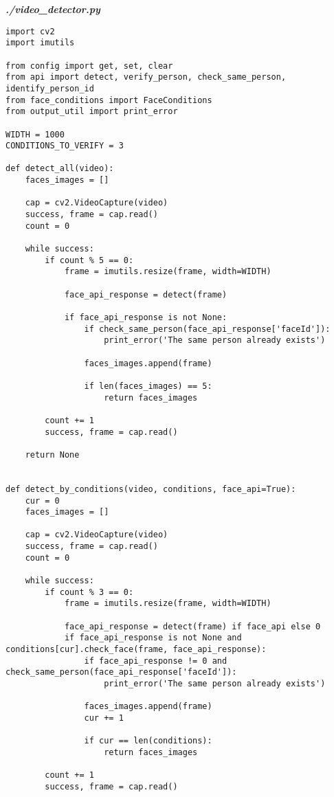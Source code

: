 \textit{\textbf{./video\_detector.py}}
\begin{verbatim}
import cv2
import imutils

from config import get, set, clear
from api import detect, verify_person, check_same_person, identify_person_id
from face_conditions import FaceConditions
from output_util import print_error

WIDTH = 1000
CONDITIONS_TO_VERIFY = 3

def detect_all(video):
    faces_images = []

    cap = cv2.VideoCapture(video)
    success, frame = cap.read()
    count = 0

    while success:
        if count % 5 == 0:
            frame = imutils.resize(frame, width=WIDTH)

            face_api_response = detect(frame)

            if face_api_response is not None:
                if check_same_person(face_api_response['faceId']):
                    print_error('The same person already exists')

                faces_images.append(frame)

                if len(faces_images) == 5:
                    return faces_images

        count += 1
        success, frame = cap.read()

    return None


def detect_by_conditions(video, conditions, face_api=True):
    cur = 0
    faces_images = []

    cap = cv2.VideoCapture(video)
    success, frame = cap.read()
    count = 0

    while success:
        if count % 3 == 0:
            frame = imutils.resize(frame, width=WIDTH)

            face_api_response = detect(frame) if face_api else 0
            if face_api_response is not None and conditions[cur].check_face(frame, face_api_response):
                if face_api_response != 0 and check_same_person(face_api_response['faceId']):
                    print_error('The same person already exists')

                faces_images.append(frame)
                cur += 1

                if cur == len(conditions):
                    return faces_images

        count += 1
        success, frame = cap.read()


\end{verbatim}
